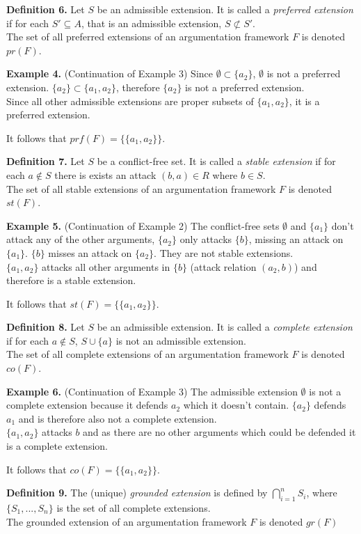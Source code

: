 \documentclass[draft,final]{vutinfth} %
\newcommand{\hl}{\par\medskip}
\newcommand{\dl}{\par\bigskip}
\begin{document}
\textbf{Definition 6.} Let $S$ be an admissible extension. It is called a \emph{preferred extension} if for each $S'\subseteq A$, that is an admissible extension, $S\not\subset S'$.\\
The set of all preferred extensions of an argumentation framework $F$ is denoted $pr(F)$.\dl

\textbf{Example 4.} (Continuation of Example 3) Since $\emptyset\subset\{a_2\}$, \(\emptyset\) is not a preferred extension. $\{a_2\}\subset\{a_1,a_2\}$, therefore $\{a_2\}$ is not a preferred extension.\\
Since all other admissible extensions are proper subsets of $\{a_1,a_2\}$, it is a preferred extension.\hl
It follows that $prf(F)=\{\{a_1,a_2\}\}$.\dl

\textbf{Definition 7.} Let $S$ be a conflict-free set. It is called a \emph{stable extension} if for each $a\not\in S$ there is exists an attack $(b,a)\in R$ where $b\in S$.\\
The set of all stable extensions of an argumentation framework $F$ is denoted $st(F)$.\dl

\textbf{Example 5.} (Continuation of Example 2) The conflict-free sets $\emptyset$ and $\{a_1\}$ don't attack any of the other arguments, $\{a_2\}$ only attacks $\{b\}$, missing an attack on $\{a_1\}$. $\{b\}$ misses an attack on $\{a_2\}$. They are not stable extensions.\\
$\{a_1,a_2\}$ attacks all other arguments in $\{b\}$ (attack relation $(a_2,b)$) and therefore is a stable extension.\hl
It follows that $st(F)=\{\{a_1,a_2\}\}$.\dl

\textbf{Definition 8.} Let $S$ be an admissible extension. It is called a \emph{complete extension} if for each $a\not\in S$, $S\cup \{a\}$ is not an admissible extension.\\
The set of all complete extensions of an argumentation framework $F$ is denoted $co(F)$.\dl

\textbf{Example 6.} (Continuation of Example 3) The admissible extension $\emptyset$ is not a complete extension because it defends $a_2$ which it doesn't contain. $\{a_2\}$ defends $a_1$ and is therefore also not a complete extension.\\
$\{a_1,a_2\}$ attacks $b$ and as there are no other arguments which could be defended it is a complete extension.\hl
It follows that $co(F)=\{\{a_1,a_2\}\}$.\dl

\textbf{Definition 9.} The (unique) \emph{grounded extension} is defined by $\bigcap\limits_{i=1}^n{S_i}$, where $\{S_1,...,S_n\}$ is the set of all complete extensions.\\
The grounded extension of an argumentation framework $F$ is denoted $gr(F)$\dl
\end{document}
